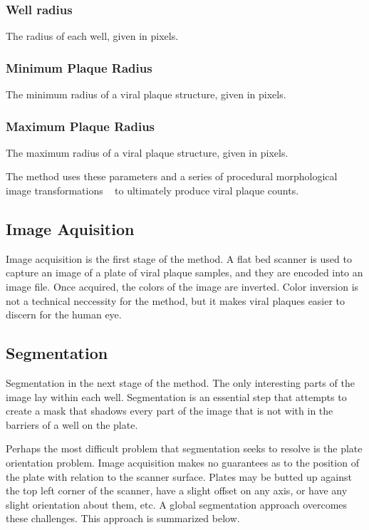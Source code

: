 \documentclass[11pt,final,twocolumn]{IEEEtran}
\begin{document}
\subsubsection{Well radius}
The radius of each well, given in pixels.

\subsubsection{Minimum Plaque Radius}
 The minimum radius of a viral plaque structure, given in pixels.

\subsubsection{Maximum Plaque Radius}
 The maximum radius of a viral plaque structure, given in pixels.


The method uses these parameters and a series of procedural morphological image transformations ~\cite{morphological} to ultimately produce viral plaque counts.

\subsection{Image Aquisition}
Image acquisition  is the first stage of the method. A flat bed scanner is used to capture an image of a plate of viral plaque samples, and they are encoded into an image file. Once acquired, the colors of the image are inverted. Color inversion is not a technical neccessity for the method, but it makes viral plaques easier to discern for the human eye.

\subsection{Segmentation}
Segmentation in the next stage of the method. The only interesting parts of the image lay within each well. Segmentation is an essential step that attempts to create a mask that shadows every part of the image that is not with in the barriers of a well on the plate. 

Perhaps the most difficult problem that segmentation seeks to resolve is the plate orientation problem. Image acquisition makes no guarantees as to the position of the plate with relation to the scanner surface. Plates may be butted up against the top left corner of the scanner, have a slight offset on any axis, or have any slight orientation about them, etc. A global segmentation approach overcomes these challenges. This approach is summarized below.
\end{document}
